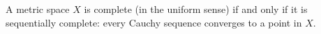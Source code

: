 A metric space $X$ is complete (in the uniform sense) if and only if it is sequentially complete: every Cauchy sequence converges to a point in $X$.
